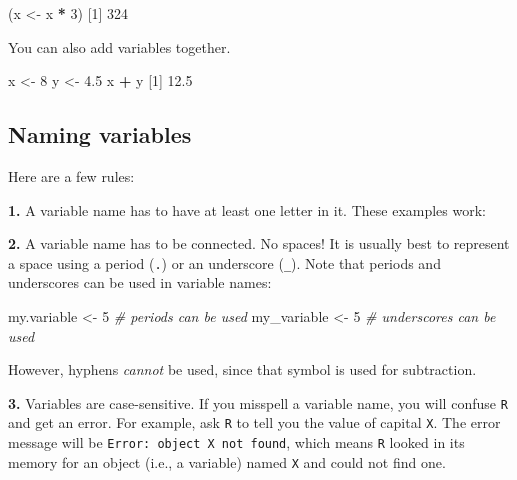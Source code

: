 \documentclass[
]{book}
\newenvironment{Shaded}{\begin{snugshade}}{\end{snugshade}}
\newcommand{\CommentTok}[1]{\textcolor[rgb]{0.56,0.35,0.01}{\textit{#1}}}
\newcommand{\DecValTok}[1]{\textcolor[rgb]{0.00,0.00,0.81}{#1}}
\newcommand{\FloatTok}[1]{\textcolor[rgb]{0.00,0.00,0.81}{#1}}
\newcommand{\NormalTok}[1]{#1}
\newcommand{\OtherTok}[1]{\textcolor[rgb]{0.56,0.35,0.01}{#1}}
\newcommand{\SpecialCharTok}[1]{\textcolor[rgb]{0.81,0.36,0.00}{\textbf{#1}}}
\begin{document}
\begin{Shaded}
\begin{Highlighting}[]
\NormalTok{(x }\OtherTok{\textless{}{-}}\NormalTok{ x }\SpecialCharTok{*} \DecValTok{3}\NormalTok{)}
\NormalTok{[}\DecValTok{1}\NormalTok{] }\DecValTok{324}
\end{Highlighting}
\end{Shaded}

You can also add variables together.

\begin{Shaded}
\begin{Highlighting}[]
\NormalTok{x }\OtherTok{\textless{}{-}} \DecValTok{8}
\NormalTok{y }\OtherTok{\textless{}{-}} \FloatTok{4.5}
\NormalTok{x }\SpecialCharTok{+}\NormalTok{ y}
\NormalTok{[}\DecValTok{1}\NormalTok{] }\FloatTok{12.5}
\end{Highlighting}
\end{Shaded}

\subsection*{Naming variables}\label{naming-variables}

Here are a few rules:

\textbf{1.} A variable name has to have at least one letter in it. These examples work:

\textbf{2.} A variable name has to be connected. No spaces! It is usually best to represent a space using a period (\texttt{.}) or an underscore (\texttt{\_}). Note that periods and underscores can be used in variable names:

\begin{Shaded}
\begin{Highlighting}[]
\NormalTok{my.variable }\OtherTok{\textless{}{-}} \DecValTok{5} \CommentTok{\# periods can be used}
\NormalTok{my\_variable }\OtherTok{\textless{}{-}} \DecValTok{5} \CommentTok{\# underscores can be used}
\end{Highlighting}
\end{Shaded}

However, hyphens \emph{cannot} be used, since that symbol is used for subtraction.

\textbf{3.} Variables are case-sensitive. If you misspell a variable name, you will confuse \texttt{R} and get an error. For example, ask \texttt{R} to tell you the value of capital \texttt{X}. The error message will be \texttt{Error:\ object\ \textquotesingle{}X\textquotesingle{}\ not\ found}, which means \texttt{R} looked in its memory for an object (i.e., a variable) named \texttt{X} and could not find one.
\end{document}
